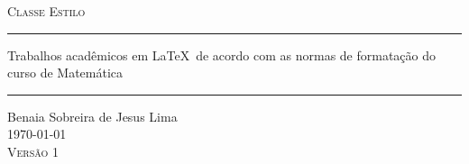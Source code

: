 \documentclass[manual,palatino,fontecodigo,codigo,glenn,refnum]{Estilo}
\begin{document}
\frontmatter %
\thispagestyle{empty}

\vspace*{6cm}
\begin{center}
   {
   \scshape\huge Classe Estilo\vspace*{-0.35cm}
   \noindent\rule{\textwidth}{3pt}
   }
   {
   \Large\artemisia Trabalhos acadêmicos em \LaTeX\ de acordo com as
   normas de formatação do curso de Matemática\vspace*{-0.35cm}
   }
   \noindent\rule{\textwidth}{3pt}
\end{center}
\vspace{6.5cm}

\begin{center}
	Benaia Sobreira de Jesus Lima\\
	\today\\
    \textcolor{estilo}{{\scshape Versão 1}}
\end{center}
\tableofcontents    %







\nocite{*}  %
\renewcommand{\bibname}{Referências}         %


\end{document}
